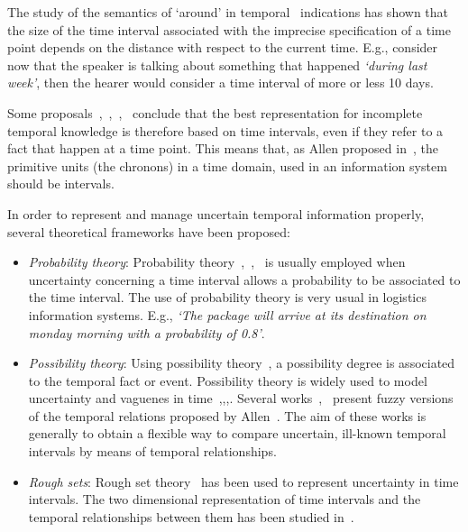 The study of the semantics of `around' in temporal~\cite{Dev98} indications has shown that the size of the time interval associated with the imprecise specification of a time point depends on the distance with respect to the current time. E.g., consider now that the speaker is talking about something that happened \emph{`during last week'}, then the hearer would consider a time interval of more or less 10 days. 


Some proposals~\cite{knight1993},~\cite{Cru97},~\cite{nagypal2003},~\cite{Chountas2000} conclude that the best representation for incomplete temporal knowledge is therefore based on time intervals, even if they refer to a fact that happen at a time point. This means that, as Allen proposed in~\cite{Allen83}, the primitive units (the chronons) in a time domain, used in an information system should be intervals.

In order to represent and manage uncertain temporal information properly, several theoretical frameworks have been proposed:

\begin{itemize}
\item \emph{Probability theory}:
Probability theory~\cite{Dey1996},~\cite{Lakshmanan1997},~\cite{Haddawy1996} is usually employed when uncertainty concerning a time interval allows a probability to be associated to the time interval. The use of probability theory is very usual in logistics information systems. E.g., \emph{`The package will arrive at its destination on monday morning with a probability of 0.8'}.



\item \emph{Possibility theory}:
Using possibility theory~\cite{Dubois:Prade:1988:PossibilityTheory}, a possibility degree is associated to the temporal fact or event. Possibility theory is widely used to model uncertainty and vaguenes in time~\cite{Dubois:jucs_9_9:fuzziness_and_uncertainty_in},\cite{Dubois89},\cite{devos94},\cite{nagypal2003}. Several works~\cite{schockaert08},~\cite{ohlbach2004} present fuzzy versions of the temporal relations proposed by Allen~\cite{Allen83}. The aim of these works is generally to obtain a flexible way to compare uncertain, ill-known temporal intervals by means of temporal relationships.


\item \emph{Rough sets}:
Rough set theory~\cite{Pawlak1995} has been used to represent uncertainty in time intervals. The two dimensional representation of time intervals and the temporal relationships between them has been studied in~\cite{Qia09}.
\end{itemize}


